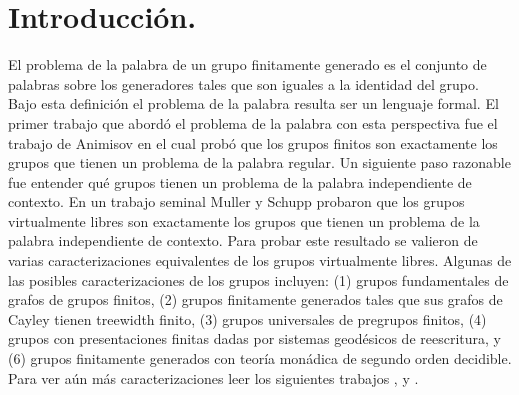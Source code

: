 \documentclass[tesis.tex]{subfiles}
\begin{document}
	\chapter*{Introducción.}
	
	
	El problema de la palabra de un grupo finitamente generado es el conjunto de palabras sobre los generadores tales que son iguales a la identidad del grupo.
	Bajo esta definición el problema de la palabra resulta ser un lenguaje formal.
	El primer trabajo que abordó el problema de la palabra con esta perspectiva fue el trabajo de Animisov \cite{anisimov1971languages} en el cual probó que los grupos finitos son exactamente los grupos que tienen un problema de la palabra regular.
	Un siguiente paso razonable fue entender qué grupos tienen un problema de la palabra independiente de contexto.
	En un trabajo seminal \cite{muller1983groups} Muller y Schupp probaron que los grupos virtualmente libres son exactamente los grupos que tienen un problema de la palabra independiente de contexto.
	Para probar este resultado se valieron de varias caracterizaciones equivalentes de los grupos virtualmente libres.
	Algunas de las posibles caracterizaciones de los grupos \vl incluyen: (1) grupos fundamentales de grafos de grupos finitos, (2) grupos finitamente generados tales que sus grafos de Cayley tienen treewidth finito, (3) grupos universales de pregrupos finitos, (4) grupos con presentaciones finitas dadas por sistemas geodésicos de reescritura, y (6) grupos finitamente generados con teoría monádica de segundo orden decidible. 
	Para ver aún más caracterizaciones leer los siguientes trabajos \cite{diekert2017context}, \cite{antolin2011cayley} y \cite{araujo2017geometric}.
\end{document}
